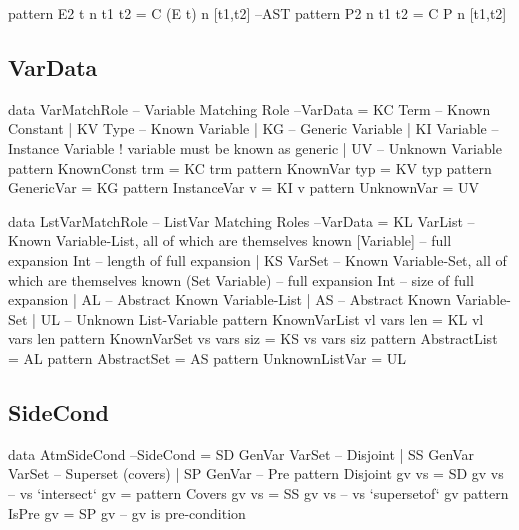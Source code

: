 \begin{code}
pattern E2 t n t1 t2  = C (E t) n [t1,t2]                                --AST
pattern P2   n t1 t2  = C P     n [t1,t2]
\end{code}

\subsection{VarData}

\begin{code}
data VarMatchRole -- Variable Matching Role                          --VarData
  =  KC Term     -- Known Constant
  |  KV Type     -- Known Variable
  |  KG          -- Generic Variable
  |  KI Variable -- Instance Variable ! variable must be known as generic
  |  UV          -- Unknown Variable
pattern KnownConst trm = KC trm
pattern KnownVar typ   = KV typ
pattern GenericVar     = KG
pattern InstanceVar v  = KI v
pattern UnknownVar     = UV
\end{code}

\begin{code}
data LstVarMatchRole -- ListVar Matching Roles                       --VarData
 = KL VarList        -- Known Variable-List, all of which are themselves known
      [Variable]     -- full expansion
      Int            -- length of full expansion
 | KS VarSet         -- Known Variable-Set, all of which are themselves known
      (Set Variable) -- full expansion
      Int            -- size of full expansion
 | AL                -- Abstract Known Variable-List
 | AS                -- Abstract Known Variable-Set
 | UL                -- Unknown List-Variable
pattern KnownVarList vl vars len  =  KL vl vars len
pattern KnownVarSet  vs vars siz  =  KS vs vars siz
pattern AbstractList              =  AL
pattern AbstractSet               =  AS
pattern UnknownListVar            =  UL
\end{code}

\subsection{SideCond}

\begin{code}
data AtmSideCond                                                    --SideCond
 = SD  GenVar VarSet -- Disjoint
 | SS  GenVar VarSet -- Superset (covers)
 | SP  GenVar        -- Pre
pattern Disjoint gv vs = SD  gv vs  --  vs `intersect`  gv = {}
pattern Covers   gv vs = SS  gv vs  --  vs `supersetof` gv
pattern IsPre    gv    = SP  gv     --  gv is pre-condition
\end{code}


